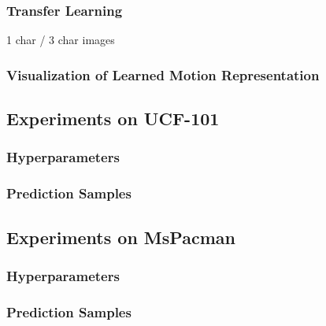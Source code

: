 \subsubsection{Transfer Learning}

1 char / 3 char images

\subsubsection{Visualization of Learned Motion Representation}


\subsection{Experiments on UCF-101}

\subsubsection{Hyperparameters}

\subsubsection{Prediction Samples}


\subsection{Experiments on MsPacman}

\subsubsection{Hyperparameters}

\subsubsection{Prediction Samples}






